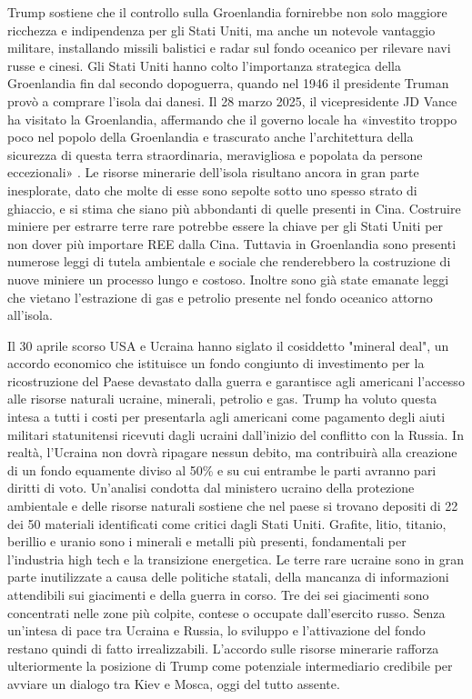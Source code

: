 \documentclass[12pt,a4paper,oneside]{book}
\begin{document}
Trump sostiene che il controllo sulla Groenlandia fornirebbe non solo maggiore ricchezza e indipendenza per gli Stati Uniti, ma anche un notevole vantaggio militare, installando missili balistici e radar sul fondo oceanico per rilevare navi russe e cinesi.
Gli Stati Uniti hanno colto l'importanza strategica della Groenlandia fin dal secondo dopoguerra, quando nel 1946 il presidente Truman provò a comprare l'isola dai danesi. Il 28 marzo 2025, il vicepresidente JD Vance ha visitato la Groenlandia, affermando che il governo locale ha «investito troppo poco nel popolo della Groenlandia e trascurato anche l'architettura della sicurezza di questa terra straordinaria, meravigliosa e popolata da persone eccezionali» \cite{foxnews2024greenland}.
Le risorse minerarie dell'isola risultano ancora in gran parte inesplorate, dato che molte di esse sono sepolte sotto uno spesso strato di ghiaccio, e si stima che siano più abbondanti di quelle presenti in Cina. Costruire miniere per estrarre terre rare potrebbe essere la chiave per gli Stati Uniti per non dover più importare REE dalla Cina.
Tuttavia in Groenlandia sono presenti numerose leggi di tutela ambientale e sociale che renderebbero la costruzione di nuove miniere un processo lungo e costoso. Inoltre sono già state emanate leggi che vietano l'estrazione di gas e petrolio presente nel fondo oceanico attorno all'isola.

Il 30 aprile scorso USA e Ucraina hanno siglato il cosiddetto "mineral deal", un accordo economico che istituisce un fondo congiunto di investimento per la ricostruzione del Paese devastato dalla guerra e garantisce agli americani l'accesso alle risorse naturali ucraine, minerali, petrolio e gas. Trump ha voluto questa intesa a tutti i costi per presentarla agli americani come pagamento degli aiuti militari statunitensi ricevuti dagli ucraini dall'inizio del conflitto con la Russia. In realtà, l'Ucraina non dovrà ripagare nessun debito, ma contribuirà alla creazione di un fondo equamente diviso al 50\% e su cui entrambe le parti avranno pari diritti di voto.
Un'analisi condotta dal ministero ucraino della protezione ambientale e delle risorse naturali sostiene che nel paese si trovano depositi di 22 dei 50 materiali identificati come critici dagli Stati Uniti. Grafite, litio, titanio, berillio e uranio sono i minerali e metalli più presenti, fondamentali per l'industria high tech e la transizione energetica. Le terre rare ucraine sono in gran parte inutilizzate a causa delle politiche statali, della mancanza di informazioni attendibili sui giacimenti e della guerra in corso. Tre dei sei giacimenti sono concentrati nelle zone più colpite, contese o occupate dall'esercito russo.
Senza un'intesa di pace tra Ucraina e Russia, lo sviluppo e l'attivazione del fondo restano quindi di fatto irrealizzabili. L'accordo sulle risorse minerarie rafforza ulteriormente la posizione di Trump come potenziale intermediario credibile per avviare un dialogo tra Kiev e Mosca, oggi del tutto assente.
\end{document}
